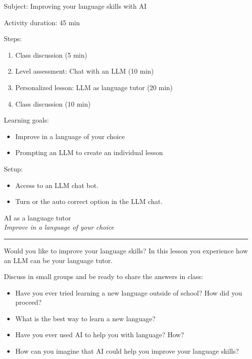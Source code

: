 \documentclass[12pt]{article}
\newcounter{exercise}
\newcommand{\exercisetitle}[1]{%
\stepcounter{exercise}
  \vspace{0.5cm}
  \colorbox{maincolor}{%
    \makebox[\dimexpr\linewidth-2\fboxsep][l]{%
      \textcolor{white}{\faPen\ Assignment \theexercise:~ #1}%
    }%
  }
  \vspace{0.3cm}
}
\begin{document}
\vspace*{0.5\textheight}

Subject: Improving your language skills with AI

Activity duration: 45 min

\vspace{0.5cm}

Steps:
\begin{enumerate}
\item Class discussion (5 min)
\item Level assessment: Chat with an LLM (10 min)
\item Personalized lesson: LLM as language tutor (20 min)
\item Class discussion (10 min)
\end{enumerate}

Learning goals:

\begin{itemize}
    \item Improve in a language of your choice
    \item Prompting an LLM to create an individual lesson
\end{itemize}


Setup: 
\begin{itemize}
    \item Access to an LLM chat bot. 
    \item Turn or the auto correct option in the LLM chat.
\end{itemize}



\newpage

\begin{center}
    {\Huge \color{maincolor} AI as a language tutor}\\[5pt]
    {\large \textit{Improve in a language of your choice}}\\
    \rule{\linewidth}{1pt}
\end{center}

\vspace{0.5cm}

Would you like to improve your language skills? In this lesson you experience how an LLM can be your language tutor. 

\exercisetitle{Initial Discussion} 

Discuss in small groups and be ready to share the answers in class:
\begin{itemize}
\item   Have you ever tried learning a new language outside of school? How did you proceed?
\item   What is the best way to learn a new language?
\item   Have you ever used AI to help you with language? How?
\item   How can you imagine that AI could help you improve your language skills?
\end{itemize}
\end{document}
